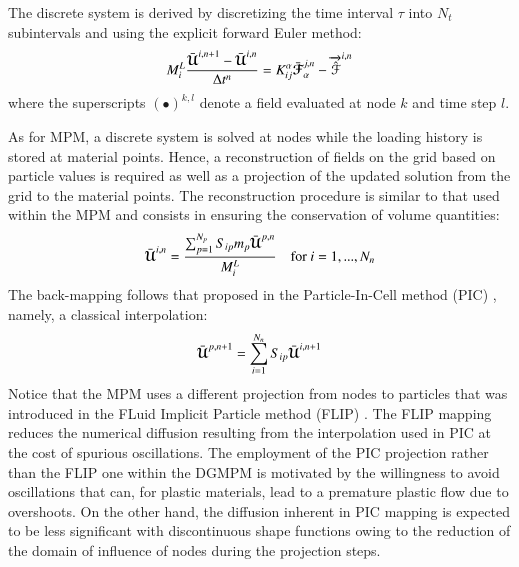 The discrete system is derived by discretizing the time interval $\tau$ into $N_t$ subintervals and using the explicit forward Euler method:
\begin{equation}
  \label{eq:DGMPM_discrete}
  M^L_i \frac{\bar{{\boldsymbol{\mathcal{U}}}}^{i,n+1} - \bar{{\boldsymbol{\mathcal{U}}}}^{i,n}}{\Delta t^{n} } = K^\alpha_{ij} \bar{{\boldsymbol{\mathcal{F}}}}_{\alpha}^{j,n} - {\overrightarrow{\hat{\mathcal{F}}}}^{i,n}  
\end{equation}
where the superscripts $(\bullet)^{k,l}$ denote a field evaluated at node $k$ and time step $l$.

As for MPM, a discrete system is solved at nodes while the loading history is stored at material points.
Hence, a reconstruction of fields on the grid based on particle values is required as well as a projection of the updated solution from the grid to the material points.
The reconstruction procedure is similar to that used within the MPM and consists in ensuring the conservation of volume quantities:
\begin{equation}
  \label{eq:reconstruction}
  \bar{{\boldsymbol{\mathcal{U}}}}^{i,n} =  \frac{\sum_{p=1}^{N_p}S_{ip}m_p\bar{{\boldsymbol{\mathcal{U}}}}^{p,n}}{M_{i}^L }  \quad \text{for } i=1,...,N_n
\end{equation}
The back-mapping follows that proposed in the Particle-In-Cell method (PIC) \cite{PIC}, namely, a classical interpolation:
\begin{equation}
  \label{eq:back_mapping}
  \bar{{\boldsymbol{\mathcal{U}}}}^{p,n+1}=\sum_{i=1}^{N_n} S_{ip}\bar{{\boldsymbol{\mathcal{U}}}}^{i,n+1}
\end{equation}
Notice that the MPM uses a different projection from nodes to particles that was introduced in the FLuid Implicit Particle method (FLIP) \cite{Mass_Flip}.
The FLIP mapping reduces the numerical diffusion resulting from the interpolation used in PIC at the cost of spurious oscillations.
The employment of the PIC projection rather than the FLIP one within the DGMPM is motivated by the willingness to avoid oscillations that can, for plastic materials, lead to a premature plastic flow due to overshoots.
On the other hand, the diffusion inherent in PIC mapping is expected to be less significant with discontinuous shape functions owing to the reduction of the domain of influence of nodes during the projection steps.




